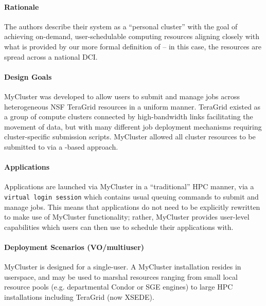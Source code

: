 \documentclass{sig-alternate}
\begin{document}
\paragraph{Rationale}
The authors describe their system
as a ``personal cluster'' with the goal of achieving on-demand,
user-schedulable computing resources aligning closely with what is
provided by our more formal definition of \pilotjobs -- in this case,
the resources are spread across a national DCI.

\paragraph{Design Goals}
MyCluster was developed to allow users to submit and manage
jobs across heterogeneous NSF TeraGrid resources in a uniform
manner.  TeraGrid existed as a group of compute clusters
connected by high-bandwidth links facilitating the movement
of data, but with many different job deployment mechanisms
requiring cluster-specific submission scripts.  MyCluster
allowed all cluster resources to be submitted to via a
\pilotjob-based approach.

\paragraph{Applications}
Applications are launched via MyCluster in a ``traditional''
HPC manner, via a \texttt{virtual
login session} which contains usual queuing commands to submit
and manage jobs.  This means that applications do not need
to be explicitly rewritten to make use of MyCluster functionality;
rather, MyCluster provides user-level \pilotjob capabilities
which users can then use to schedule their applications with.

\paragraph{Deployment Scenarios (VO/multiuser)}
MyCluster is designed for a single-user.  A MyCluster
installation resides in userspace, and may be used
to marshal resources ranging from small local resource pools 
(e.g. departmental Condor or SGE engines) to large HPC installations
including TeraGrid (now XSEDE).
\end{document}
